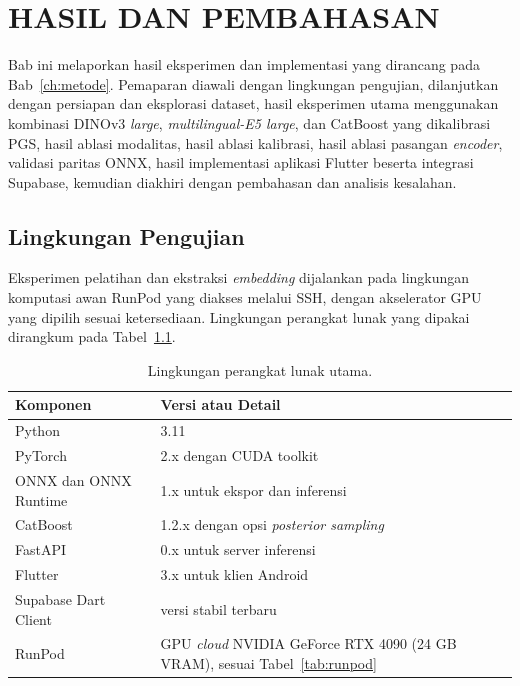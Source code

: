 \chapter{HASIL DAN PEMBAHASAN}
\label{ch:hasil}

Bab ini melaporkan hasil eksperimen dan implementasi yang dirancang pada Bab~\ref{ch:metode}. Pemaparan diawali dengan lingkungan pengujian, dilanjutkan dengan persiapan dan eksplorasi dataset, hasil eksperimen utama menggunakan kombinasi DINOv3 \textit{large}, \textit{multilingual-E5 large}, dan CatBoost yang dikalibrasi PGS, hasil ablasi modalitas, hasil ablasi kalibrasi, hasil ablasi pasangan \textit{encoder}, validasi paritas ONNX, hasil implementasi aplikasi Flutter beserta integrasi Supabase, kemudian diakhiri dengan pembahasan dan analisis kesalahan.

\section{Lingkungan Pengujian}
\label{sec:lingkungan-pengujian}

Eksperimen pelatihan dan ekstraksi \textit{embedding} dijalankan pada lingkungan komputasi awan RunPod yang diakses melalui SSH, dengan akselerator GPU yang dipilih sesuai ketersediaan. Lingkungan perangkat lunak yang dipakai dirangkum pada Tabel~\ref{tab:lingkungan-software}.

\begin{table}[htbp]
\centering
\caption{Lingkungan perangkat lunak utama.}
\label{tab:lingkungan-software}
\begin{tabular}{p{4.5cm} p{8.0cm}}
\toprule
\textbf{Komponen} & \textbf{Versi atau Detail} \\
\midrule
Python & 3.11 \\
PyTorch & 2.x dengan CUDA toolkit \\
ONNX dan ONNX Runtime & 1.x untuk ekspor dan inferensi \\
CatBoost & 1.2.x dengan opsi \textit{posterior sampling} \\
FastAPI & 0.x untuk server inferensi \\
Flutter & 3.x untuk klien Android \\
Supabase Dart Client & versi stabil terbaru \\
RunPod & GPU \textit{cloud} NVIDIA GeForce RTX 4090 (24 GB VRAM), sesuai Tabel~\ref{tab:runpod} \\
\bottomrule
\end{tabular}
\end{table}

